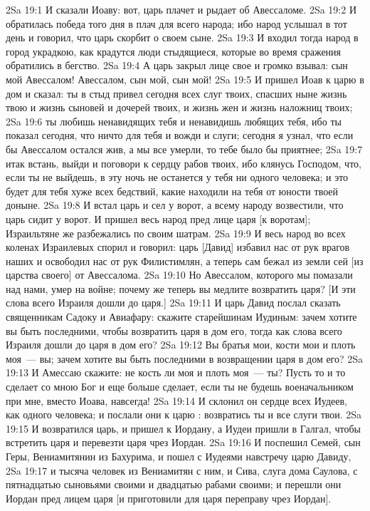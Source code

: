 \vs 2Sa 19:1 И сказали Иоаву: вот, царь плачет и рыдает об Авессаломе.
\vs 2Sa 19:2 И обратилась победа того дня в плач для всего народа; ибо народ услышал в тот день и говорил, что царь скорбит о своем сыне.
\vs 2Sa 19:3 И входил тогда народ в город украдкою, как крадутся люди стыдящиеся, которые во время сражения обратились в бегство.
\vs 2Sa 19:4 А царь закрыл лице свое и громко взывал: сын мой Авессалом! Авессалом, сын мой, сын мой!
\vs 2Sa 19:5 И пришел Иоав к царю в дом и сказал: ты в стыд привел сегодня всех слуг твоих, спасших ныне жизнь твою и жизнь сыновей и дочерей твоих, и жизнь жен и жизнь наложниц твоих;
\vs 2Sa 19:6 ты любишь ненавидящих тебя и ненавидишь любящих тебя, ибо ты показал сегодня, что ничто для тебя и вожди и слуги; сегодня я узнал, что если бы Авессалом остался жив, а мы все умерли, то тебе было бы приятнее;
\vs 2Sa 19:7 итак встань, выйди и поговори к сердцу рабов твоих, ибо клянусь Господом, что, если ты не выйдешь, в эту ночь не останется у тебя ни одного человека; и это будет для тебя хуже всех бедствий, какие находили на тебя от юности твоей доныне.
\vs 2Sa 19:8 И встал царь и сел у ворот, а всему народу возвестили, что царь сидит у ворот. И пришел весь народ пред лице царя [к воротам]; Израильтяне же разбежались по своим шатрам.
\vs 2Sa 19:9 И весь народ во всех коленах Израилевых спорил и говорил: царь [Давид] избавил нас от рук врагов наших и освободил нас от рук Филистимлян, а теперь сам бежал из земли сей [из царства своего] от Авессалома.
\vs 2Sa 19:10 Но Авессалом, которого мы помазали  над нами, умер на войне; почему же теперь вы медлите возвратить царя? [И эти слова всего Израиля дошли до царя.]
\vs 2Sa 19:11 И царь Давид послал сказать священникам Садоку и Авиафару: скажите старейшинам Иудиным: зачем хотите вы быть последними, чтобы возвратить царя в дом его, тогда как слова всего Израиля дошли до царя в дом его?
\vs 2Sa 19:12 Вы братья мои, кости мои и плоть моя~--- вы; зачем хотите вы быть последними в возвращении царя в дом его?
\vs 2Sa 19:13 И Амессаю скажите: не кость ли моя и плоть моя~--- ты? Пусть то и то сделает со мною Бог и еще больше сделает, если ты не будешь военачальником при мне, вместо Иоава, навсегда!
\vs 2Sa 19:14 И склонил он сердце всех Иудеев, как одного человека; и послали они к царю : возвратись ты и все слуги твои.
\vs 2Sa 19:15 И возвратился царь, и пришел к Иордану, а Иудеи пришли в Галгал, чтобы встретить царя и перевезти царя чрез Иордан.
\vs 2Sa 19:16 И поспешил Семей, сын Геры, Вениамитянин из Бахурима, и пошел с Иудеями навстречу царю Давиду,
\vs 2Sa 19:17 и тысяча человек из Вениамитян с ним, и Сива, слуга дома Саулова, с пятнадцатью сыновьями своими и двадцатью рабами своими; и перешли они Иордан пред лицем царя [и приготовили для царя переправу чрез Иордан].
